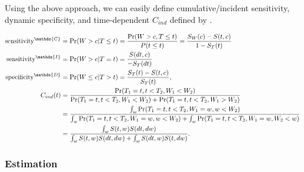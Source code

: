 \documentclass[]{article}\usepackage[]{graphicx}\usepackage[]{color}
\begin{document}
Using the above approach, we can easily define cumulative/incident sensitivity, dynamic specificity, and time-dependent $C_{ind}$ defined by \cite{heagerty2005survival}. 
\begin{linenomath}
\begin{align}
  \label{sensSpecAndMore}
    \text{sensitivity}^{\mathds{C}} &= \Pr(W  > c| T  \leq t) = \frac{\Pr(W  > c, T  \leq t)}{P(t \leq t)} = \frac{ S_W(c) - S (t,c) }{ 1- S_T(t)}\notag\\
    \text{sensitivity}^{\mathds{I}} &= \Pr(W  > c| T  = t) = \frac{ S (dt,c) }{ -S_T(dt)}\notag\\
    \text{specificity}^{\mathds{D}} &= \Pr(W  \leq c| T  > t) =  \frac{ S_T(t) - S (t,c) }{ S_T(t)},\\
    C_{ind}(t) &= \frac{   \Pr(T_1 = t, t < T_2 , W_1 < W_2 )   }{  \Pr(T_1 = t, t < T_2 , W_1 < W_2 )   +  \Pr(T_1 = t, t < T_2, W_1 > W_2 )   } \notag\\
        &= \frac{  \int_w \Pr(T_1 = t, t < T_2, W_1 = w,  w < W_2 )   }{  \int_w \Pr(T_1 = t, t < T_2, W_1 = w,  w < W_2 )  +    \int_w  \Pr(T_1 = t, t < T_2, W_1 = w, W_2 < w )   }\notag \\
        &= \frac{  \int_w S(t, w) S(dt, dw)   }{  \int_w S(t, w) S(dt, dw)    +    \int_w  S(dt, w) S(t, dw)  }.
\end{align}
\end{linenomath}


\subsubsection{Estimation}
\end{document}
